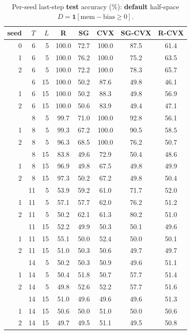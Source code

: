 \documentclass[11pt]{article}
\begin{document}
\begin{table}[p]
\centering
\caption{Per-seed last-step \textbf{test} accuracy (\%): \textbf{default} half-space $D=\mathbf{1}[\mathrm{mem}-\mathrm{bias}\ge 0]$.}
\label{tab:xor-test-perseed-default}
\begin{tabular}{rrrccccc}
\toprule
seed & $T$ & $L$ & R & SG & CVX & SG-CVX & R-CVX \\
\midrule
0 & 6 & 5 & 100.0 & 72.7 & 100.0 & 87.5 & 61.4 \\
1 & 6 & 5 & 100.0 & 76.2 & 100.0 & 75.2 & 63.5 \\
2 & 6 & 5 & 100.0 & 72.2 & 100.0 & 78.3 & 65.7 \\
\addlinespace
0 & 6 & 15 & 100.0 & 50.2 & 87.6 & 49.8 & 46.1 \\
1 & 6 & 15 & 100.0 & 50.2 & 88.3 & 49.8 & 56.9 \\
2 & 6 & 15 & 100.0 & 50.6 & 83.9 & 49.4 & 47.1 \\
\addlinespace
0 & 8 & 5 & 99.7 & 71.0 & 100.0 & 92.8 & 56.1 \\
1 & 8 & 5 & 99.3 & 67.2 & 100.0 & 90.5 & 58.5 \\
2 & 8 & 5 & 96.3 & 68.5 & 100.0 & 76.2 & 50.7 \\
\addlinespace
0 & 8 & 15 & 83.8 & 49.6 & 72.9 & 50.4 & 48.6 \\
1 & 8 & 15 & 96.9 & 49.8 & 67.5 & 49.8 & 49.9 \\
2 & 8 & 15 & 97.3 & 50.2 & 67.2 & 49.8 & 50.4 \\
\addlinespace
0 & 11 & 5 & 53.9 & 59.2 & 61.0 & 71.7 & 52.0 \\
1 & 11 & 5 & 57.1 & 57.7 & 62.0 & 76.2 & 51.2 \\
2 & 11 & 5 & 50.2 & 62.1 & 61.3 & 80.2 & 51.0 \\
\addlinespace
0 & 11 & 15 & 52.2 & 49.9 & 50.3 & 50.1 & 49.6 \\
1 & 11 & 15 & 55.1 & 50.0 & 52.4 & 50.0 & 50.1 \\
2 & 11 & 15 & 51.0 & 50.3 & 50.6 & 49.7 & 49.7 \\
\addlinespace
0 & 14 & 5 & 50.2 & 50.3 & 50.9 & 49.6 & 51.1 \\
1 & 14 & 5 & 50.4 & 51.8 & 50.7 & 57.7 & 51.4 \\
2 & 14 & 5 & 49.8 & 52.6 & 52.2 & 57.7 & 51.6 \\
\addlinespace
0 & 14 & 15 & 51.0 & 49.6 & 49.6 & 49.6 & 51.3 \\
1 & 14 & 15 & 50.6 & 50.0 & 51.0 & 50.0 & 50.6 \\
2 & 14 & 15 & 49.7 & 49.5 & 51.1 & 49.5 & 50.8 \\
\bottomrule
\end{tabular}
\end{table}
\end{document}
